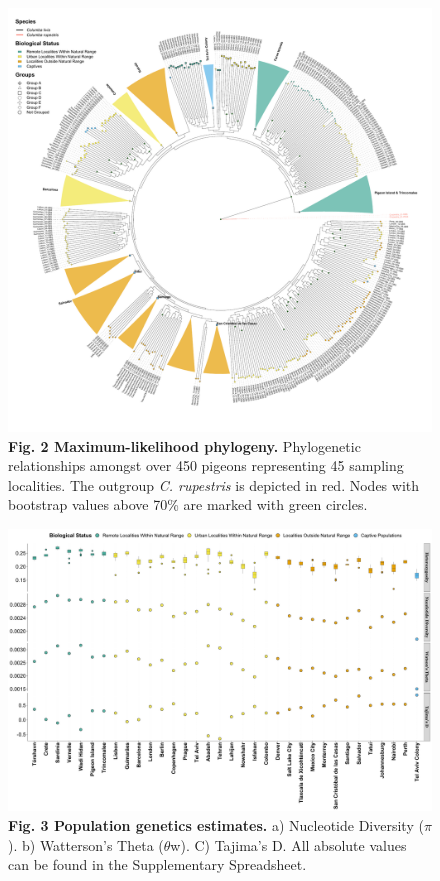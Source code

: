 \documentclass[twoside, british, a4paper]{article}
\begin{document}
\begin{figure}[!ht]
\centering
\includegraphics[width=1\textwidth]{../FPG--Plots/FPG--Phylogenies/FPG--PhyloData_II.pdf}
\caption*{ \scriptsize \textbf{Fig. 2 Maximum-likelihood phylogeny.} Phylogenetic relationships amongst over 450 pigeons representing 45 sampling localities. The outgroup \textit{C. rupestris} is depicted in red. Nodes with bootstrap values above 70\% are marked with green circles.}
\label{MainText:FPG--Phylo}
\end{figure}

\begin{figure}[!ht]
\centering
\includegraphics[width=1\textwidth]{../FPG--Plots/FPG--PopGenEstimates/FPG--PopGenEstimates.pdf}
\caption*{ \scriptsize \textbf{Fig. 3 Population genetics estimates.} a) Nucleotide Diversity ($\pi$). b) Watterson's Theta ($\theta$w). C) Tajima’s D. All absolute values can be found in the Supplementary Spreadsheet.}
\label{MainText:FPG--PopGenEstimates}
\end{figure}
\end{document}
